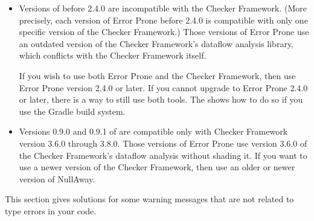 \begin{itemize}
\item
Versions of  before 2.4.0 are
incompatible with the Checker Framework.  (More precisely, each version of
Error Prone before 2.4.0 is compatible with only one specific version of
the Checker Framework.)  Those versions of Error Prone
use an outdated version of the Checker Framework's dataflow analysis
library, which conflicts with the Checker Framework itself.

If you wish to use both Error Prone and the Checker Framework, then use
Error Prone version 2.4.0 or later.
If you cannot upgrade to Error Prone 2.4.0 or later, there is a way to
still use both tools.  The
 shows how to do so if you use the Gradle build
system.

\item
Versions 0.9.0 and 0.9.1 of
 are compatible
only with Checker Framework version 3.6.0 through 3.8.0.  Those versions of
Error Prone use version 3.6.0 of the Checker Framework's dataflow analysis
without shading it.  If you want to use a newer version of the Checker
Framework, then use an older or newer version of NullAway.

\end{itemize}



This section gives solutions for some warning messages that are not related
to type errors in your code.

